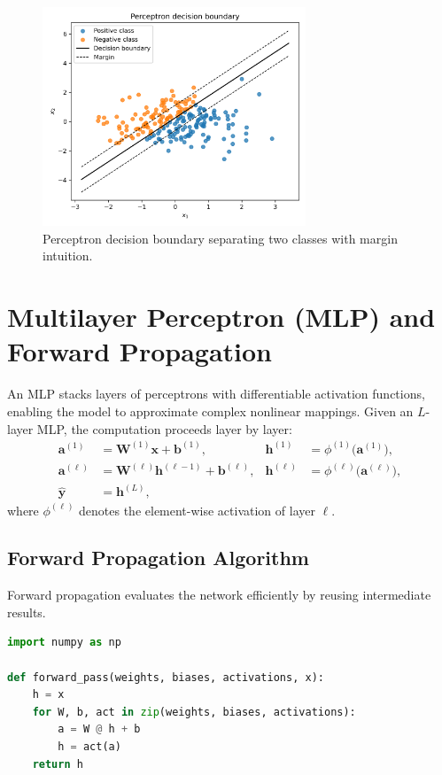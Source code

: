 ﻿\documentclass{article}
\begin{document}
\begin{figure}[H]
  \centering
  \includegraphics[width=0.7\textwidth]{perceptron_decision_boundary.png}
  \caption{Perceptron decision boundary separating two classes with margin intuition.}
  \label{fig:perceptron_decision_boundary}
\end{figure}
\FloatBarrier

\section{Multilayer Perceptron (MLP) and Forward Propagation}
An MLP stacks layers of perceptrons with differentiable activation functions, enabling the model to approximate complex nonlinear mappings. Given an $L$-layer MLP, the computation proceeds layer by layer:
\begin{align}
  \mathbf{a}^{(1)} &= \mathbf{W}^{(1)}\mathbf{x} + \mathbf{b}^{(1)}, & \mathbf{h}^{(1)} &= \phi^{(1)}\bigl(\mathbf{a}^{(1)}\bigr), \\
  \mathbf{a}^{(\ell)} &= \mathbf{W}^{(\ell)}\mathbf{h}^{(\ell-1)} + \mathbf{b}^{(\ell)}, & \mathbf{h}^{(\ell)} &= \phi^{(\ell)}\bigl(\mathbf{a}^{(\ell)}\bigr), \\
  \hat{\mathbf{y}} &= \mathbf{h}^{(L)},
\end{align}
where $\phi^{(\ell)}$ denotes the element-wise activation of layer $\ell$.

\subsection{Forward Propagation Algorithm}
Forward propagation evaluates the network efficiently by reusing intermediate results.

\begin{lstlisting}[language=Python, caption={Forward pass for a dense MLP.}]
import numpy as np

def forward_pass(weights, biases, activations, x):
    h = x
    for W, b, act in zip(weights, biases, activations):
        a = W @ h + b
        h = act(a)
    return h
\end{lstlisting}
\end{document}
